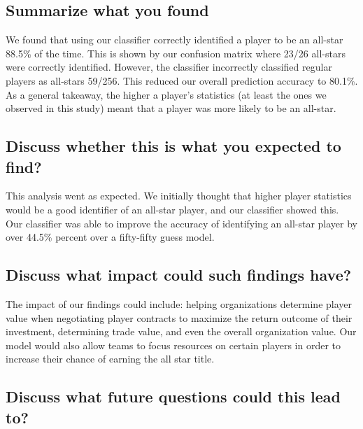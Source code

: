 \documentclass[
]{article}
\begin{document}
\hypertarget{summarize-what-you-found}{%
\subsection{Summarize what you found}\label{summarize-what-you-found}}

We found that using our classifier correctly identified a player to be an all-star 88.5\% of the time. This is shown by our confusion matrix where 23/26 all-stars were correctly identified. However, the classifier incorrectly classified regular players as all-stars 59/256. This reduced our overall prediction accuracy to 80.1\%. As a general takeaway, the higher a player's statistics (at least the ones we observed in this study) meant that a player was more likely to be an all-star.

\hypertarget{discuss-whether-this-is-what-you-expected-to-find}{%
\subsection{Discuss whether this is what you expected to find?}\label{discuss-whether-this-is-what-you-expected-to-find}}

This analysis went as expected. We initially thought that higher player statistics would be a good identifier of an all-star player, and our classifier showed this. Our classifier was able to improve the accuracy of identifying an all-star player by over 44.5\% percent over a fifty-fifty guess model.

\hypertarget{discuss-what-impact-could-such-findings-have}{%
\subsection{Discuss what impact could such findings have?}\label{discuss-what-impact-could-such-findings-have}}

The impact of our findings could include: helping organizations determine player value when negotiating player contracts to maximize the return outcome of their investment, determining trade value, and even the overall organization value. Our model would also allow teams to focus resources on certain players in order to increase their chance of earning the all star title.

\hypertarget{discuss-what-future-questions-could-this-lead-to}{%
\subsection{Discuss what future questions could this lead to?}\label{discuss-what-future-questions-could-this-lead-to}}
\end{document}
